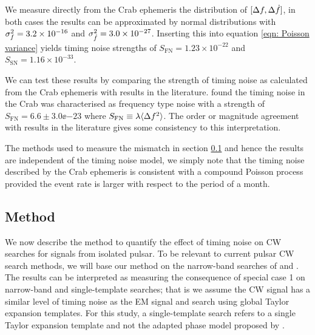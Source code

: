 \documentclass[../full_thesis/full_thesis.tex]{subfiles}
\begin{document}

We measure directly from the Crab ephemeris the distribution of
$[\Delta f,\Delta\dot{f}]$, in both  cases the results can be approximated by
normal distributions with $\sigma_{f}^{2}=3.2\times10^{-16}$ and
$\sigma_{\dot{f}}^{2}=3.0\times10^{-27}$. Inserting this into equation
\eqref{eqn: Poisson variance} yields timing noise strengths of
$S_{\textrm{FN}}=1.23\times10^{-22}$ and $S_{\textrm{SN}}=1.16\times10^{-33}$.

We can test these results by comparing the strength of timing noise as
calculated from the Crab ephemeris with results in the literature.
\citet{Cordes1981} found the timing noise in the Crab was characterised  as
frequency type noise with a strength of $S_{\textrm{FN}}=6.6 \pm 3.0 \ee{-23}$
where $S_{\textrm{FN}} \equiv \lambda \langle\Delta f^{2}\rangle$.  The order
or magnitude agreement with results in the literature gives some consistency to
this interpretation.

The methods used to measure the mismatch in section \ref{sec: narrow-band method} and hence
the results are independent of the timing noise model, we simply note that the
timing noise described by the Crab ephemeris is consistent with a compound
Poisson process provided the event rate is larger with respect to the period of
a month.

\subsection{Method}
\label{sec: narrow-band method}
We now describe the method to quantify the effect of timing noise on CW
searches for signals from isolated pulsar. 
To be relevant to current pulsar CW search methods, we will base our
method on the narrow-band searches of \citet{ligo2008} and \citet{LIGO2015}. The results can be interpreted as measuring the consequence of
special case 1 on narrow-band and single-template searches; that is we assume
the CW signal has a similar level of timing noise as the EM signal and search
using global Taylor expansion templates. For this study, a single-template
search refers to a single Taylor expansion template and not the adapted phase
model proposed by \citet{Pitkin2004}. 
\end{document}
